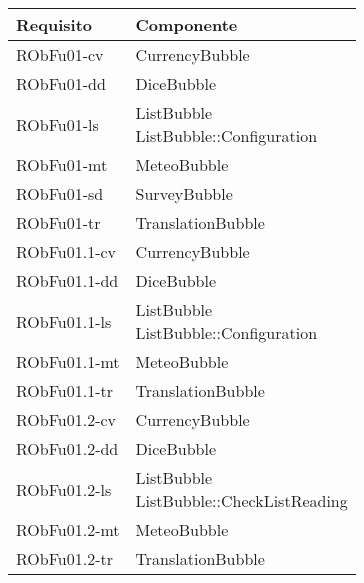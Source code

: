 \begin{center}
\begin{longtable}{|
*{1}{>{\centering\arraybackslash}p{2.5cm}|}
*{1}{>{\centering\arraybackslash}p{7.5cm}|}}
\hline \textbf{Requisito} & \textbf{Componente}\\
\hline \endhead
\hline \endfoot

RObFu01-cv & \makecell{CurrencyBubble
\\}\\\hline
RObFu01-dd & \makecell{DiceBubble
\\}\\\hline
RObFu01-ls & \makecell{ListBubble
\\ListBubble::Configuration
\\}\\\hline
RObFu01-mt & \makecell{MeteoBubble
\\}\\\hline
RObFu01-sd & \makecell{SurveyBubble
\\}\\\hline
RObFu01-tr & \makecell{TranslationBubble
\\}\\\hline
RObFu01.1-cv & \makecell{CurrencyBubble
\\}\\\hline
RObFu01.1-dd & \makecell{DiceBubble
\\}\\\hline
RObFu01.1-ls & \makecell{ListBubble
\\ListBubble::Configuration
\\}\\\hline
RObFu01.1-mt & \makecell{MeteoBubble
\\}\\\hline
RObFu01.1-tr & \makecell{TranslationBubble
\\}\\\hline
RObFu01.2-cv & \makecell{CurrencyBubble
\\}\\\hline
RObFu01.2-dd & \makecell{DiceBubble
\\}\\\hline
RObFu01.2-ls & \makecell{ListBubble
\\ListBubble::CheckListReading
\\}\\\hline
RObFu01.2-mt & \makecell{MeteoBubble
\\}\\\hline
RObFu01.2-tr & \makecell{TranslationBubble
\\}\\\hline

\end{longtable}
\end{center}
